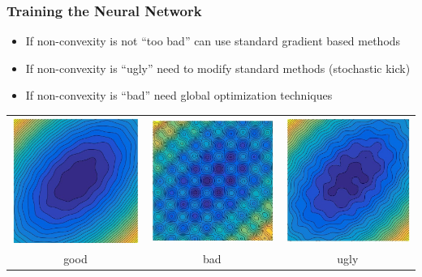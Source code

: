 \documentclass[12pt,fleqn,handout]{beamer}
\begin{document}
\begin{frame}[fragile]\frametitle{Training the Neural Network}

\begin{itemize}
\item If non-convexity is not ``too bad'' can use standard gradient based methods
\item If non-convexity is ``ugly'' need to modify standard methods (stochastic kick)
\item If non-convexity is ``bad'' need global optimization techniques
\end{itemize}

	\begin{center}
	\begin{tabular}{ccc}
		\includegraphics[width=.3\textwidth]{images/goodConv} &
		\includegraphics[width=.3\textwidth]{images/badConv} &
		\includegraphics[width=.3\textwidth]{images/uglyConv} \\
		good & bad & ugly \\
		\end{tabular}
		\end{center}



\end{frame}
\end{document}
